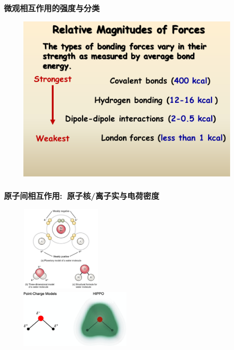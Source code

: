 \frame
{
	\frametitle{微观相互作用的强度与分类}
\begin{figure}[h!]
\centering
\vspace{-5.5pt}
\includegraphics[height=0.65\textwidth,width=1.05\textwidth,viewport=0 100 750 530,clip]{Figures/Bond-order.png}
\label{Bond-order}
\end{figure}
}

\frame
{
	\frametitle{原子间相互作用:~原子核/离子实与电荷密度}
\begin{figure}[h!]
\centering
\vspace{-10.5pt}
\includegraphics[height=1.70in,width=1.60in,viewport=0 0 170 180,clip]{Figures/Structure_of_water_molecule.jpg}\\
\includegraphics[height=1.20in,width=2.20in,viewport=0 0 480 280,clip]{Figures/H2O_bond.png}
\label{MO-Bond_model-H2O}
\end{figure}
}

